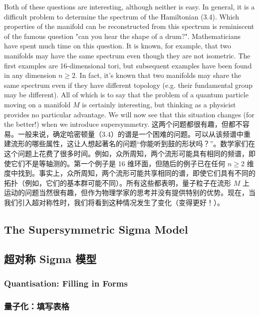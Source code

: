 \documentclass{article}
\begin{document}
\begin{paracol}{2}
Both of these questions are interesting, although neither is easy. In general, it is a diﬃcult problem to determine the spectrum of the Hamiltonian (3.4). Which properties of the manifold can be reconstructed from this spectrum is reminiscent of the famous question "can you hear the shape of a drum?". Mathematicians have spent much time on this question. It is known, for example, that two manifolds may have the same spectrum even though they are not isometric. The ﬁrst examples are 16-dimensional tori, but subsequent examples have been found in any dimension $n \geq 2$. In fact, it’s known that two manifolds may share the same spectrum even if they have diﬀerent topology (e.g. their fundamental group may be diﬀerent). All of which is to say that the problem of a quantum particle moving on a manifold $M$ is certainly interesting, but thinking as a physicist provides no particular advantage. We will now see that this situation changes (for the better!) when we introduce supersymmetry.
\switchcolumn
这两个问题都很有趣，但都不容易。一般来说，确定哈密顿量（3.4）的谱是一个困难的问题。可以从该频谱中重建流形的哪些属性，这让人想起著名的问题“你能听到鼓的形状吗？”。数学家们在这个问题上花费了很多时间。例如，众所周知，两个流形可能具有相同的频谱，即使它们不是等轴测的。第一个例子是 16 维环面，但随后的例子已在任何 $n \geq 2$ 维度中找到。事实上，众所周知，两个流形可能共享相同的谱，即使它们具有不同的拓扑（例如，它们的基本群可能不同）。所有这些都表明，量子粒子在流形 $M$ 上运动的问题当然很有趣，但作为物理学家的思考并没有提供特别的优势。现在，当我们引入超对称性时，我们将看到这种情况发生了变化（变得更好！）。
\switchcolumn*

\subsection{The Supersymmetric Sigma Model}
\switchcolumn
\subsection*{超对称 Sigma 模型}
\switchcolumn*

\subsubsection{Quantisation: Filling in Forms}
\switchcolumn
\subsubsection*{量子化：填写表格}
\switchcolumn*


\end{paracol}
\end{document}
